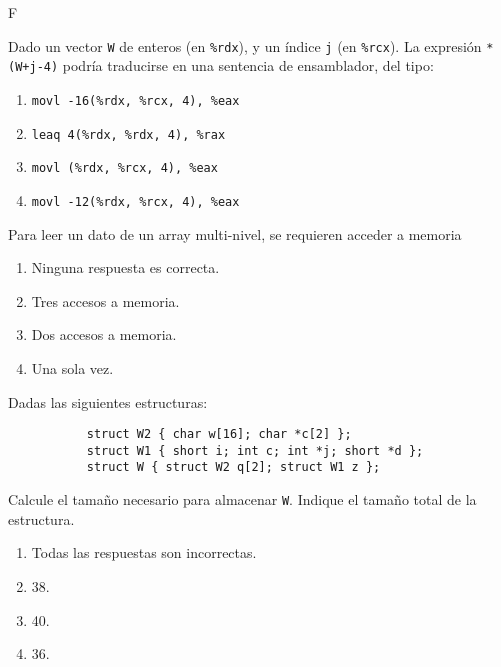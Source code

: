 \documentclass[12pt]{article}
\begin{document}
    F\begin{ejercicio}
        Dado un vector \verb|W| de enteros (en \verb|%rdx|), y un índice \verb|j| (en \verb|%rcx|). La expresión \verb|*(W+j-4)| podría traducirse en una sentencia de ensamblador, del tipo:
        \begin{enumerate}[label=\alph*)]
            \item \verb|movl -16(%rdx, %rcx, 4), %eax|
            \item \verb|leaq 4(%rdx, %rdx, 4), %rax|
            \item \verb|movl (%rdx, %rcx, 4), %eax|
            \item \verb|movl -12(%rdx, %rcx, 4), %eax|
        \end{enumerate}
    \end{ejercicio}
    \begin{ejercicio}
        Para leer un dato de un array multi-nivel, se requieren acceder a memoria
        \begin{enumerate}[label=\alph*)]
            \item Ninguna respuesta es correcta.
            \item Tres accesos a memoria.
            \item Dos accesos a memoria.
            \item Una sola vez.
        \end{enumerate}
    \end{ejercicio}
    \begin{ejercicio}
        Dadas las siguientes estructuras:
        \begin{verbatim}
           struct W2 { char w[16]; char *c[2] };
           struct W1 { short i; int c; int *j; short *d };
           struct W { struct W2 q[2]; struct W1 z };
        \end{verbatim}
        Calcule el tamaño necesario para almacenar \verb|W|. Indique el tamaño total de la estructura.
        \begin{enumerate}[label=\alph*)]
            \item Todas las respuestas son incorrectas.
            \item 38.
            \item 40.
            \item 36.
        \end{enumerate}
    \end{ejercicio}
\end{document}
